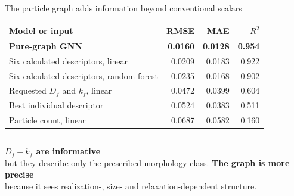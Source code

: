 \documentclass[aspectratio=169,11pt]{beamer}
\newcommand{\hi}[1]{\textcolor{tumblue}{\textbf{#1}}}
\begin{document}
\begin{frame}{The particle graph adds information beyond conventional scalars}
  \small
  \begin{table}
    \centering
    \begin{tabular}{lrrr}
      \toprule
      Model or input & RMSE & MAE & $R^2$\\
      \midrule
      \textbf{Pure-graph GNN} & \textbf{0.0160} & \textbf{0.0128} & \textbf{0.954}\\
      Six calculated descriptors, linear & 0.0209 & 0.0183 & 0.922\\
      Six calculated descriptors, random forest & 0.0235 & 0.0168 & 0.902\\
      Requested $D_f$ and $k_f$, linear & 0.0472 & 0.0399 & 0.604\\
      Best individual descriptor & 0.0524 & 0.0383 & 0.511\\
      Particle count, linear & 0.0687 & 0.0582 & 0.160\\
      \bottomrule
    \end{tabular}
  \end{table}
  \vspace{.55cm}
  \begin{columns}[T,onlytextwidth]
    \centering
      \hi{$D_f+k_f$ are informative}\\[-.1em]
      \small but they describe only the prescribed morphology class.
    \centering
      \hi{The graph is more precise}\\[-.1em]
      \small because it sees realization-, size- and relaxation-dependent structure.
  \end{columns}
\end{frame}
\end{document}

